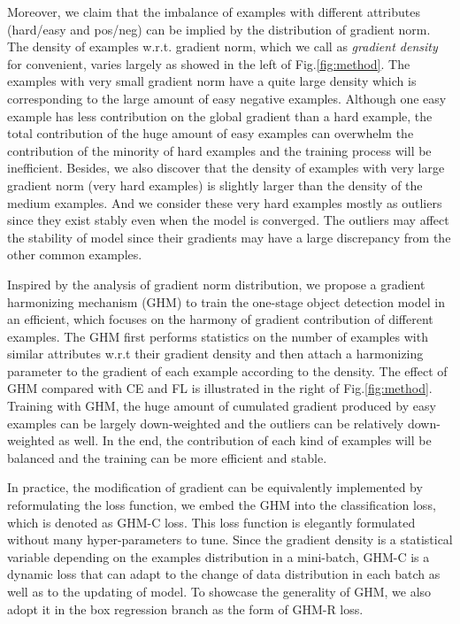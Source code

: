 \documentclass[letterpaper]{article} \usepackage{aaai19}  \usepackage{times}  \usepackage{helvet}  \usepackage{courier}  \usepackage{url}  \usepackage{graphicx}  \usepackage{amsmath,amssymb}
\begin{document}
Moreover, we claim that the imbalance of examples with different attributes (hard/easy and pos/neg) can be implied by the distribution of gradient norm. The density of examples w.r.t. gradient norm, which we call as \textit{gradient density} for convenient, varies largely as showed in the left of Fig.\ref{fig:method}. The examples with very small gradient norm have a quite large density which is corresponding to the large amount of easy negative examples. Although one easy example has less contribution on the global gradient than a hard example, the total contribution of the huge amount of easy examples can overwhelm the contribution of the minority of hard examples and the training process will be inefficient. Besides, we also discover that the density of examples with very large gradient norm (very hard examples) is slightly larger than the density of the medium examples. And we consider these very hard examples mostly as outliers since they exist stably even when the model is converged. The outliers may affect the stability of model since their gradients may have a large discrepancy from the other common examples.

Inspired by the analysis of gradient norm distribution, we propose a gradient harmonizing mechanism (GHM) to train the one-stage object detection model in an efficient, which focuses on the harmony of gradient contribution of different examples. The GHM first performs statistics on the number of examples with similar attributes w.r.t their gradient density and then attach a harmonizing parameter to the gradient of each example according to the density. The effect of GHM compared with CE and FL is illustrated in the right of Fig.\ref{fig:method}. Training with GHM, the huge amount of cumulated gradient produced by easy examples can be largely down-weighted and the outliers can be relatively down-weighted as well. In the end, the contribution of each kind of examples will be balanced and the training can be more efficient and stable.  

In practice, the modification of gradient can be equivalently implemented by reformulating the loss function, we embed the GHM into the classification loss, which is denoted as GHM-C loss. This loss function is elegantly formulated without many hyper-parameters to tune. Since the gradient density is a statistical variable depending on the examples distribution in a mini-batch, GHM-C is a dynamic loss that can adapt to the change of data distribution in each batch as well as to the updating of model. To showcase the generality of GHM, we also adopt it in the box regression branch as the form of GHM-R loss.
\end{document}
